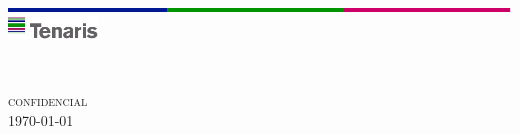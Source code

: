 \begin{titlepage}

\begin{center}


\includegraphics[width=1.0\textwidth]{../../common/images/separatorTenaris.png}\\[0.1in]
\includegraphics[width=0.18\textwidth]{../../common/images/logo_tenaris.jpg}\\[0.1in]

\vspace{2.0in}


\LARGE \textbf {\proyecto{}}\\[0.5in]


\vspace{1.0in}

\LARGE \emph{\actividad{}}

\hspace{.5in}

	   

\vspace{.1in}


\vfill
\normalsize
\textsc{confidencial}\\
\vspace{0.2cm}
\today

\end{center}

\end{titlepage}
